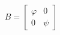 \documentclass[preview]{standalone}
\begin{document}
\begin{align*}
B = \begin{bmatrix} \varphi & 0 \\ 0 & \psi \end{bmatrix}
\end{align*}
\end{document}
